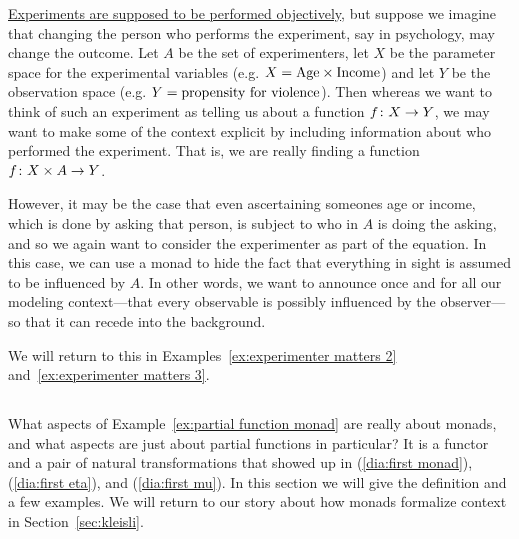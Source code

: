 \documentclass[CT4S-EN-RU]{subfiles}
\begin{document}
\begin{exampleRUS}\label{ex:partial function monad}
\end{exampleRUS}

\begin{applicationENG}\label{app:experimenter matters}
\href{http://en.wikipedia.org/wiki/Observer-expectancy_effect}{\text Experiments are supposed to be performed objectively}, but suppose we imagine that changing the person who performs the experiment, say in psychology, may change the outcome. Let $A$ be the set of experimenters, let $X$ be the parameter space for the experimental variables (e.g. $X=\textnormal{Age}\times\textnormal{Income}$) and let $Y$ be the observation space (e.g. $Y=\textnormal{propensity for violence}$). Then whereas we want to think of such an experiment as telling us about a function $f\colon X\rightarrow Y$, we may want to make some of the context explicit by including information about who performed the experiment. That is, we are really finding a function $f\colon X\times A\rightarrow Y$. 

However, it may be the case that even ascertaining someones age or income, which is done by asking that person, is subject to who in $A$ is doing the asking, and so we again want to consider the experimenter as part of the equation. In this case, we can use a monad to hide the fact that everything in sight is assumed to be influenced by $A$. In other words, we want to announce once and for all our modeling context—that every observable is possibly influenced by the observer—so that it can recede into the background.

We will return to this in Examples~\ref{ex:experimenter matters 2} and~\ref{ex:experimenter matters 3}.
\end{applicationENG}

\begin{applicationRUS}\label{app:experimenter matters}
\end{applicationRUS}


\subsection{}

\begin{blockENG}
What aspects of Example~\ref{ex:partial function monad} are really about monads, and what aspects are just about partial functions in particular? It is a functor and a pair of natural transformations that showed up in (\ref{dia:first monad}), (\ref{dia:first eta}), and (\ref{dia:first mu}). In this section we will give the definition and a few examples. We will return to our story about how monads formalize context in Section~\ref{sec:kleisli}.
\end{blockENG}
\end{document}
